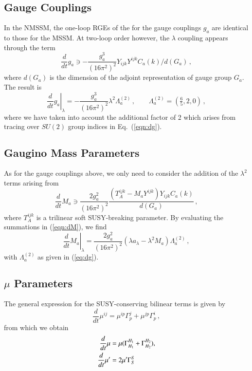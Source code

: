 \documentclass[final,3p,times,pdflatex]{elsarticle}
\newcommand{\lamsq}{\lambda^2}
\newcommand{\dt}{\frac{d}{dt}}
\begin{document}
\subsection{Gauge Couplings}
In the NMSSM, the one-loop RGEs of the for the gauge couplings $g_a$ are 
identical to those for the MSSM.  At two-loop order however, the $\lambda$ 
coupling appears through the term
%
\begin{equation}
\dt g_a \ni - \frac{g_a^3}{(16\pi^2)^2} Y_{ijk}Y^{ijk} C_a(k)/d(G_a)\,,  
\label{eqn:dg}
\end{equation}
%
where $d(G_a)$ is the dimension of the adjoint representation of gauge group 
$G_a$.  The result is
%
\begin{equation}
\left. \dt g_a\right|_\lambda = -\frac{g_a^3}{(16\pi^2)^2}\lamsq \Lambda_a^{(2)}\,,
\qquad \Lambda_a^{(2)} = (\tfrac{6}{5},2,0)\,,
\label{eq:dg}
\end{equation}
%
where we have taken into account the additional factor of 2 which arises from 
tracing over $SU(2)$ group indices in Eq.~(\ref{eqn:dg}).

\subsection{Gaugino Mass Parameters}
As for the gauge couplings above, we only need to consider the addition of the 
$\lambda^2$ terms arising from
%
\begin{equation}
\dt M_a \ni \frac{2g_a^2}{(16\pi^2)^2} 
\frac{(T_A^{ijk} - M_a Y^{ijk}) Y_{ijk}C_a(k)}{d(G_a)}\,,
\label{eqn:dM}
\end{equation}
%
where $T_A^{ijk}$ is a trilinear soft SUSY-breaking parameter. By evaluating the summations in (\ref{eqn:dM}), we find
%
\begin{equation}
\left. \dt M_a\right|_{\lambda} = \frac{2g_a^2}{(16\pi^2)^2} (\lambda a_\lambda - \lambda^2 M_a)\Lambda^{(2)}_a\,,
\end{equation}
%
with $\Lambda_a^{(2)}$ as given in (\ref{eq:dg}).

\subsection{$\mu$ Parameters}
The general expression \cite{MV94,Yam94} for the SUSY-conserving bilinear terms is given by  
%
\begin{equation}
\dt \mu^{ij} = \mu^{ip}\Gamma_p^j + \mu^{jp}\Gamma_p^i\,,
\end{equation}
%
from which we obtain
%
\begin{align}
\dt\mu &= \mu (\Gamma_{H_1}^{H_1} + \Gamma_{H_2}^{H_2}), \notag \\
%
\dt\mu' &= 2\mu' \Gamma_S^S
\end{align}
%
\end{document}
